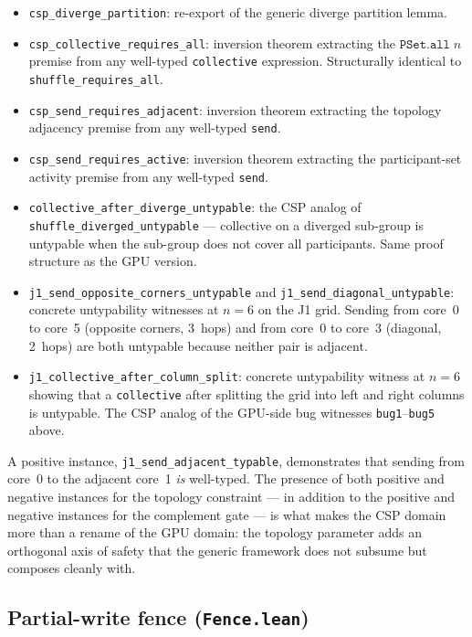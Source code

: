 \documentclass[acmsmall,screen,review,anonymous,nonacm]{acmart}
\begin{document}
\begin{itemize}
  \item \texttt{csp\_diverge\_partition}: re-export of the generic diverge partition lemma.
  \item \texttt{csp\_collective\_requires\_all}: inversion theorem extracting the $\texttt{PSet.all}\;n$ premise from any well-typed \texttt{collective} expression. Structurally identical to \texttt{shuffle\_requires\_all}.
  \item \texttt{csp\_send\_requires\_adjacent}: inversion theorem extracting the topology adjacency premise from any well-typed \texttt{send}.
  \item \texttt{csp\_send\_requires\_active}: inversion theorem extracting the participant-set activity premise from any well-typed \texttt{send}.
  \item \texttt{collective\_after\_diverge\_untypable}: the CSP analog of \texttt{shuffle\_diverged\_untypable} --- collective on a diverged sub-group is untypable when the sub-group does not cover all participants. Same proof structure as the GPU version.
  \item \texttt{j1\_send\_opposite\_corners\_untypable} and \texttt{j1\_send\_diagonal\_untypable}: concrete untypability witnesses at $n = 6$ on the J1 grid. Sending from core~0 to core~5 (opposite corners, 3~hops) and from core~0 to core~3 (diagonal, 2~hops) are both untypable because neither pair is adjacent.
  \item \texttt{j1\_collective\_after\_column\_split}: concrete untypability witness at $n = 6$ showing that a \texttt{collective} after splitting the grid into left and right columns is untypable. The CSP analog of the GPU-side bug witnesses \texttt{bug1}--\texttt{bug5} above.
\end{itemize}

A positive instance, \texttt{j1\_send\_adjacent\_typable}, demonstrates that sending from core~0 to the adjacent core~1 \emph{is} well-typed. The presence of both positive and negative instances for the topology constraint --- in addition to the positive and negative instances for the complement gate --- is what makes the CSP domain more than a rename of the GPU domain: the topology parameter adds an orthogonal axis of safety that the generic framework does not subsume but composes cleanly with.

\subsection{Partial-write fence (\texttt{Fence.lean})}\label{sec:partial-write-fence}
\end{document}

